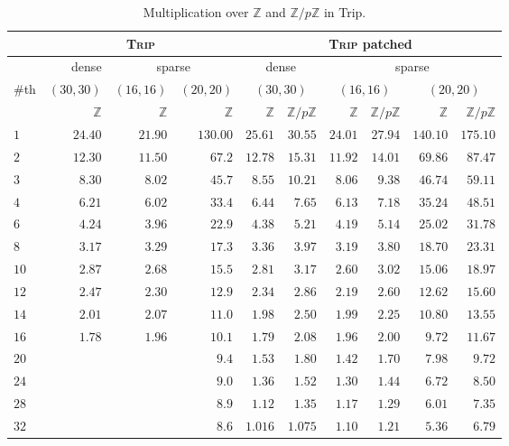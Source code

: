 \documentclass{deliverablereport}
\begin{document}
\begin{table}[htb]
\begin{tabular}{l | r | r | r | r | r | r | r | r | r |}
 & \multicolumn{3}{|c|}{\textsc{Trip}} & \multicolumn{6}{|c|}{\textsc{Trip} patched} \\ \hline
 & {dense} & \multicolumn{2}{|c|}{sparse} & \multicolumn{2}{|c|}{dense} & \multicolumn{4}{|c|}{sparse} \\ \hline
\#th  & $(30, 30)$ & $(16, 16)$ & $(20, 20)$ & \multicolumn{2}{|c|}{$(30, 30)$} & \multicolumn{2}{|c|}{$(16, 16)$} & \multicolumn{2}{|c|}{$(20, 20)$}\\ \hline
 & $\mathbb{Z}$ & $\mathbb{Z}$ & $\mathbb{Z}$ & $\mathbb{Z}$ & $\mathbb{Z}/p\mathbb{Z}$ & $\mathbb{Z}$ & $\mathbb{Z}/p\mathbb{Z}$ & $\mathbb{Z}$ & $\mathbb{Z}/p\mathbb{Z}$ \\ \hline
$1$   & $24.40$ & $21.90$ & $130.00$ &  $25.61$ & $30.55$ & $24.01$ & $27.94$ & $140.10$ & $175.10$\\ \hline
$2$   & $12.30$ & $11.50$ & $67.2$   &  $12.78$ & $15.31$ & $11.92$ & $14.01$ & $69.86$ & $87.47$\\ \hline
$3$   & $8.30$ & $8.02$  & $45.7$    &  $8.55$ & $10.21$ & $8.06$ & $9.38$ & $46.74$ & $59.11$\\ \hline
$4$   & $6.21$ & $6.02$ & $33.4$     &  $6.44$ & $7.65$ & $6.13$ & $7.18$ & $35.24$ & $48.51$\\ \hline
$6$   & $4.24$ & $3.96$ & $22.9$     &  $4.38$ & $5.21$ & $4.19$ & $5.14$ & $25.02$ & $31.78$\\ \hline
$8$   & $3.17$ & $3.29$ & $17.3$     &  $3.36$ & $3.97$ & $3.19$ & $3.80$ & $18.70$ & $23.31$\\ \hline
$10$  & $2.87$ & $2.68$ & $15.5$     &  $2.81$ & $3.17$ & $2.60$ & $3.02$ & $15.06$ & $18.97$\\ \hline
$12$  & $2.47$ & $2.30$ & $12.9$     &  $2.34$ & $2.86$ & $2.19$ & $2.60$ & $12.62$ & $15.60$\\ \hline
$14$  & $2.01$ & $2.07$  & $11.0$    &  $1.98$ & $2.50$ & $1.99$ & $2.25$ & $10.80$ & $13.55$\\ \hline
$16$  & $1.78$ & $1.96$  & $10.1$    &  $1.79$ & $2.08$ & $1.96$ & $2.00$ & $9.72$ & $11.67$\\ \hline
$20$  &  &   & $9.4$                 &  $1.53$ & $1.80$ & $1.42$ & $1.70$ & $7.98$ & $9.72$\\ \hline
$24$  &  &   & $9.0$                 &  $1.36$ & $1.52$ & $1.30$ & $1.44$ & $6.72$ & $8.50$\\ \hline
$28$  &  &   & $8.9$                 &  $1.12$ & $1.35$ & $1.17$ & $1.29$ & $6.01$ & $7.35$\\ \hline
$32$  &  &   & $8.6$                 &  $1.016$ & $1.075$ & $1.10$ & $1.21$ & $5.36$ & $6.79$\\ \hline
\end{tabular}
\caption{Multiplication over $\mathbb{Z}$ and $\mathbb{Z}/p \mathbb{Z}$ in Trip.}
\label{table_trip}
\end{table}
\end{document}
